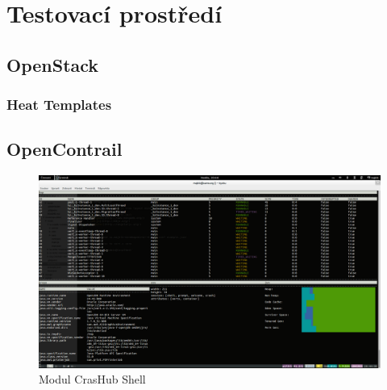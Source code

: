 \chapter{Testovací prostředí}

\section{OpenStack}\label{sub:interaction}

\subsection{}

\subsection{Heat Templates}



\section{OpenContrail}\label{sub:interaction}


\begin{figure}[h]
\begin{centering}
\includegraphics[scale=0.21]{images/real_interaction}
\par\end{centering}
\caption{Modul CrasHub Shell\label{fig:real_interaction}}
\end{figure}
